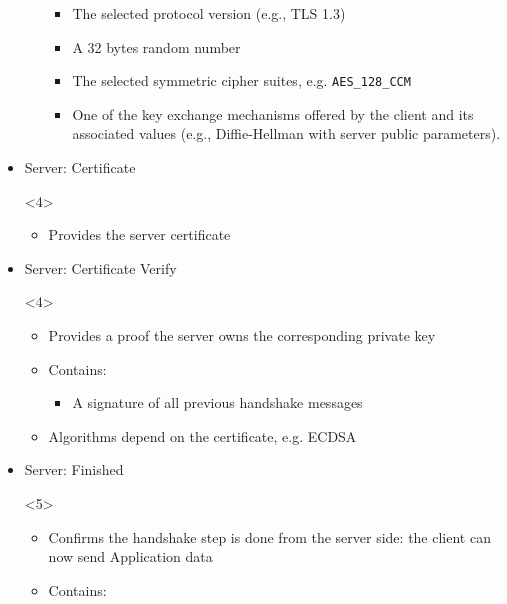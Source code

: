 \begin{frame}
\begin{columns}
\begin{column}{0.7\textwidth}
\begin{itemize}
\begin{onlyenv}
\begin{itemize}
                \begin{itemize}
                  \item The selected protocol version (e.g., TLS 1.3)
                  \item A 32 bytes random number
                  \item The selected symmetric cipher suites, e.g. \texttt{AES\_128\_CCM}
                  \item One of the key exchange mechanisms offered by the client and its
                    associated values (e.g., Diffie-Hellman with server public parameters).
                \end{itemize}
            \end{itemize}
          \end{onlyenv}
        \item<4-> Server: Certificate
          \begin{onlyenv}<4>
            \begin{itemize}
              \item Provides the server certificate
            \end{itemize}
          \end{onlyenv}
        \item<4-> Server: Certificate Verify
          \begin{onlyenv}<4>
            \begin{itemize}
              \item Provides a proof the server owns the corresponding private key
              \item Contains:
                \begin{itemize}
                  \item A signature of all previous handshake messages
                \end{itemize}
              \item Algorithms depend on the certificate, e.g. ECDSA
            \end{itemize}
          \end{onlyenv}
        \item<5-> Server: Finished
          \begin{onlyenv}<5>
            \begin{itemize}
              \item Confirms the handshake step is done from the server side: the client
                can now send Application data
              \item Contains:

\end{itemize}
\end{onlyenv}
\end{itemize}
\end{column}
\end{columns}
\end{frame}
